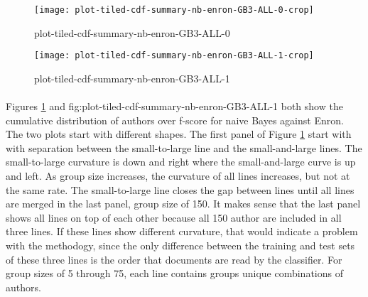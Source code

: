 	\begin{figure}[htbp!]
		\begin{center}
		\centering
		\texttt{[image: plot-tiled-cdf-summary-nb-enron-GB3-ALL-0-crop]}
		\caption{plot-tiled-cdf-summary-nb-enron-GB3-ALL-0}
		\label{fig:plot-tiled-cdf-summary-nb-enron-GB3-ALL-0}
		\end{center}
	\end{figure}
	
	\begin{figure}[htbp!]
		\begin{center}
		\centering
		\texttt{[image: plot-tiled-cdf-summary-nb-enron-GB3-ALL-1-crop]}
		\caption{plot-tiled-cdf-summary-nb-enron-GB3-ALL-1}
		\label{fig:plot-tiled-cdf-summary-nb-enron-GB3-ALL-1}
		\end{center}
	\end{figure}

\paragraph*{} Figures \ref{fig:plot-tiled-cdf-summary-nb-enron-GB3-ALL-0} and {fig:plot-tiled-cdf-summary-nb-enron-GB3-ALL-1} both show the cumulative distribution of authors over f-score for naive Bayes against Enron.  The two plots start with different shapes.  The first panel of Figure \ref{fig:plot-tiled-cdf-summary-nb-enron-GB3-ALL-0} start with with separation between the small-to-large line and the small-and-large lines.  The small-to-large curvature is down and right where the small-and-large curve is up and left.  As group size increases, the curvature of all lines increases, but not at the same rate.  The small-to-large line closes the gap between lines until all lines are merged in the last panel, group size of 150.  It makes sense that the last panel shows all lines on top of each other because all 150 author are included in all three lines.  If these lines show different curvature, that would indicate a problem with the methodogy, since the only difference between the training and test sets of these three lines is the order that documents are read by the classifier.  For group sizes of 5 through 75, each line contains groups unique combinations of authors.
